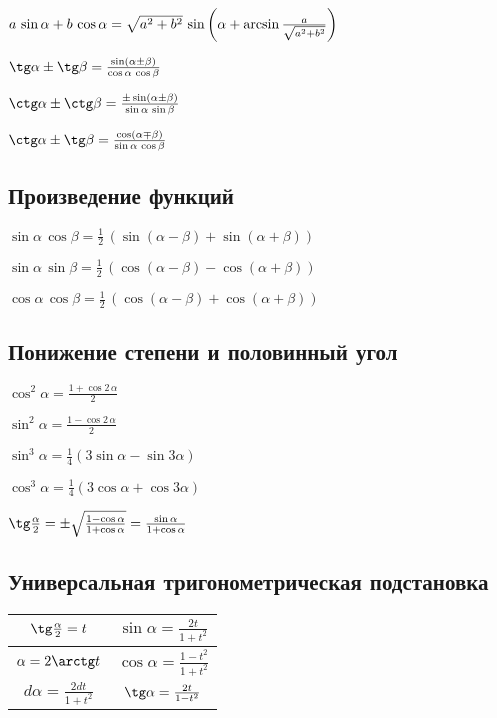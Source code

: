 $ a\, \sin \alpha + b\, \cos \alpha = \sqrt{\mathstrut a^2 + b^2}\, \sin \left(\alpha + \arcsin \frac{a}{\sqrt{\mathstrut a^2 + b^2}}\right) $

$ \tg \alpha \pm \tg \beta = \frac{\sin (\alpha \pm \beta)}{\cos \alpha\, \cos \beta} $

$ \ctg \alpha \pm \ctg \beta = \frac{\pm\sin (\alpha \pm \beta)}{\sin \alpha\, \sin \beta} $

$ \ctg \alpha \pm \tg \beta = \frac{\cos (\alpha \mp \beta)}{\sin \alpha\, \cos \beta} $

\subsection{Произведение функций}

$ \sin \alpha\, \cos \beta = \frac{1}{2}\, (\sin (\alpha - \beta) + \sin (\alpha + \beta)) $

$ \sin \alpha\, \sin \beta = \frac{1}{2}\, (\cos (\alpha - \beta) - \cos (\alpha + \beta)) $

$ \cos \alpha\, \cos \beta = \frac{1}{2}\, (\cos (\alpha - \beta) + \cos (\alpha + \beta)) $

\subsection{Понижение степени и половинный угол}

$ \cos^2 \alpha = \frac{1 + \cos 2\, \alpha}{2} $

$ \sin^2 \alpha = \frac{1 - \cos 2\, \alpha}{2} $

$ \sin^3 \alpha = \frac14(3\sin \alpha - \sin 3 \alpha) $

$ \cos^3 \alpha = \frac14(3\cos \alpha + \cos 3 \alpha) $

$ \tg \frac{\alpha}{2} = \pm \sqrt{\mathstrut \frac{1 - \cos \alpha}{1 + \cos \alpha}} = \frac{\sin \alpha}{1 + \cos \alpha} $

\subsection{Универсальная тригонометрическая подстановка}

\begin{tabu}[t]{||c|c||}
	\hline
		$ \tg \frac{\alpha}{2} = t $ & 		$ \sin \alpha = \frac{2t}{1 + t^2} $ \\
	\hline
		$ \alpha = 2\arctg t $ & 		$ \cos \alpha = \frac{1 - t^2}{1 + t^2} $ \\
	\hline
		$ d\alpha = \frac{2dt}{1+t^2}$ & 	$ \tg \alpha = \frac{2t}{1-t^2} $ \\
	\hline
\end{tabu}


